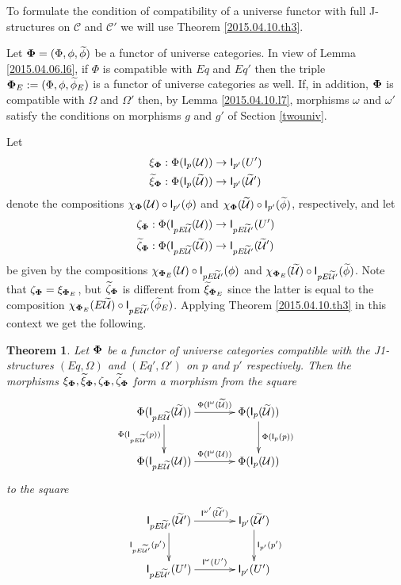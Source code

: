 \documentclass[12pt]{article}
\numberwithin{equation}{section}
\newtheorem{theorem}[proposition]{Theorem}
\newcommand{\llabel}[1]{\label{#1}}
\newcommand{\sr}{\rightarrow}
\newcommand{\wt}{\widetilde}
\newcommand{\U}{\mathcal{U}}
\newcommand{\I}{\mathsf{I}}
\begin{document}
To formulate the condition of compatibility of a universe functor with full
J-structures on $\mathcal C$ and $\mathcal C'$ we will use Theorem
\ref{2015.04.10.th3}.

Let ${\bf\Phi}=(\Phi,\phi,\wt{\phi})$ be a functor of universe categories. In
view of Lemma \ref{2015.04.06.l6}, if $\Phi$ is compatible with $Eq$ and $Eq'$
then the triple ${\bf\Phi}_{E}:=(\Phi,\phi,\wt{\phi}_{E})$ is a functor of
universe categories as well. If, in addition, ${\bf\Phi}$ is compatible with
$\Omega$ and $\Omega'$ then, by Lemma \ref{2015.04.10.l7}, morphisms $\omega$
and $\omega'$ satisfy the conditions on morphisms $g$ and $g'$ of Section
\ref{twouniv}.

Let
%
\begin{align*}
  \xi_{\bf\Phi}&:\Phi(\I_p(\U))\sr \I_{p'}(U') \\
  \wt{\xi}_{\bf\Phi}&:\Phi(\I_p(\wt{\U}))\sr \I_{p'}(\wt{\U}')
\end{align*}
%
denote the compositions $\chi_{\bf\Phi}(\U)\circ \I_{p'}(\phi)$ and
$\chi_{\bf\Phi}(\wt{\U})\circ \I_{p'}(\wt{\phi})$, respectively, and let
%
\begin{align*}
  \zeta_{\bf\Phi}&:\Phi(\I_{pE\wt{\U}}(\U))\sr \I_{pE\wt{\U}'}(U') \\
  \wt{\zeta}_{\bf\Phi}&:\Phi(\I_{pE\wt{\U}}(\wt{\U}))\sr \I_{pE\wt{\U}'}(\wt{\U}')
\end{align*}
%
be given by the compositions $\chi_{{\bf\Phi}_{E}}(\U)\circ \I_{pE\wt{\U}'}(\phi)$
and $\chi_{{\bf\Phi}_{E}}(\wt{\U})\circ \I_{pE\wt{\U}'}(\wt{\phi})$. Note that
$\zeta_{\bf\Phi}=\xi_{{\bf\Phi}_{E}}$, but $\wt{\zeta}_{\bf\Phi}$ is different
from $\wt{\xi}_{{\bf\Phi}_{E}}$ since the latter is equal to the composition
$\chi_{{\bf\Phi}_{E}}(E\wt{\U})\circ \I_{pE\wt{\U}'}(\wt{\phi}_{E})$. Applying
Theorem \ref{2015.04.10.th3} in this context we get the following.
%
\begin{theorem}
\llabel{2015.04.10.th1} Let ${\bf\Phi}$ be a functor of universe categories
compatible with the J1-structures $(Eq,\Omega)$ and $(Eq',\Omega')$ on $p$ and
$p'$ respectively. Then the morphisms $\xi_{\bf\Phi}, \wt{\xi}_{\bf\Phi},
\zeta_{\bf\Phi}, \wt{\zeta}_{\bf\Phi}$ form a morphism from the square
%
$$
\begin{xy}
          \xymatrix@C=3pc{ \Phi(\I_{pE\wt{\U}}(\wt{\U}))
            \ar[r]^-{\Phi(\I^{\omega}(\wt{\U}))} \ar[d]_{\Phi(\I_{pE\wt{\U}}(p))} &
            \Phi(\I_p(\wt{\U}))\ar[d]^-{\Phi(\I_p(p))}\\ \Phi(\I_{pE\wt{\U}}(\U))
            \ar[r]^-{\Phi(\I^{\omega}(\U))} & \Phi(\I_p(\U)) }
\end{xy}
$$
%
to the square
%
$$
\begin{xy}
          \xymatrix@C=3pc{ \I_{pE\wt{\U}'}(\wt{\U}')
            \ar[r]^-{\I^{\omega'}(\wt{\U}')} \ar[d]_-{\I_{pE\wt{\U}'}(p')} &
            \I_{p'}(\wt{\U}')\ar[d]^-{\I_{p'}(p')}\\ \I_{pE\wt{\U}'}(U')
            \ar[r]^-{\I^{\omega}(U')} & \I_{p'}(U') }
\end{xy}
$$
%
\end{theorem}
\end{document}
